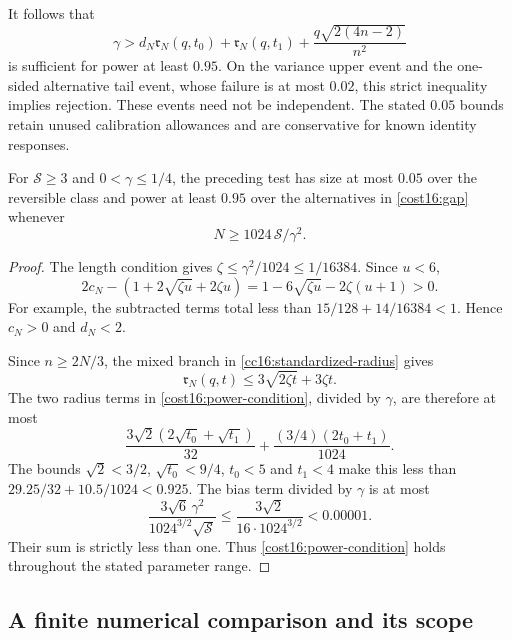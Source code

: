 It follows that
\begin{equation}
 \gamma>d_N\mathfrak r_N(q,t_0)+\mathfrak r_N(q,t_1)
                  +\frac{q\sqrt{2(4n-2)}}{n^2}
 \label{cost16:power-condition}
\end{equation}
is sufficient for power at least $0.95$. On the variance upper event and the one-sided alternative tail event, whose failure is at most $0.02$, this strict inequality implies rejection. These events need not be independent. The stated $0.05$ bounds retain unused calibration allowances and are conservative for known identity responses.

\begin{theorem}
\label{cost16:sufficient}
For $\mathcal S\ge3$ and $0<\gamma\le1/4$, the preceding test has size at most $0.05$ over the reversible class and power at least $0.95$ over the alternatives in \eqref{cost16:gap} whenever
\begin{equation}
 N\ge1024\,\mathcal S/\gamma^2.
 \label{cost16:uniform-length}
\end{equation}
\end{theorem}
\begin{proof}
The length condition gives $\zeta\le\gamma^2/1024\le1/16384$. Since $u<6$,
\[
 2c_N-(1+2\sqrt{\zeta u}+2\zeta u)
 =1-6\sqrt{\zeta u}-2\zeta(u+1)>0.
\]
For example, the subtracted terms total less than $15/128+14/16384<1$. Hence $c_N>0$ and $d_N<2$.

Since $n\ge2N/3$, the mixed branch in \eqref{cc16:standardized-radius} gives
\[
 \mathfrak r_N(q,t)\le3\sqrt{2\zeta t}+3\zeta t.
\]
The two radius terms in \eqref{cost16:power-condition}, divided by $\gamma$, are therefore at most
\[
 \frac{3\sqrt2(2\sqrt{t_0}+\sqrt{t_1})}{32}
 +\frac{(3/4)(2t_0+t_1)}{1024}.
\]
The bounds $\sqrt2<3/2$, $\sqrt{t_0}<9/4$, $t_0<5$ and $t_1<4$ make this less than $29.25/32+10.5/1024<0.925$. The bias term divided by $\gamma$ is at most
\[
 \frac{3\sqrt6\,\gamma^2}{1024^{3/2}\sqrt{\mathcal S}}
 \le\frac{3\sqrt2}{16\cdot1024^{3/2}}<0.00001.
\]
Their sum is strictly less than one. Thus \eqref{cost16:power-condition} holds throughout the stated parameter range.
\end{proof}

\subsection{A finite numerical comparison and its scope}

